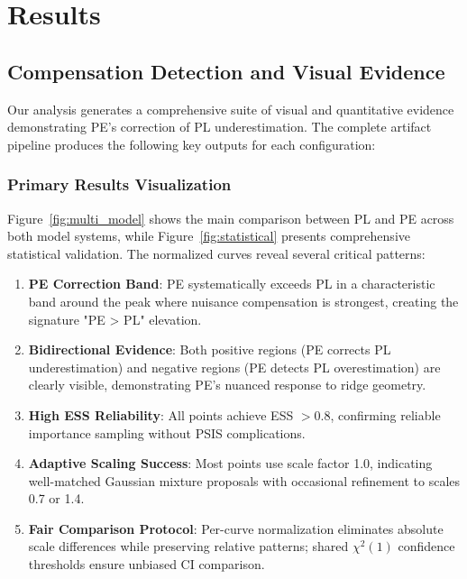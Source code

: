 \documentclass[conference]{IEEEtran}
\begin{document}
\section{Results}

\subsection{Compensation Detection and Visual Evidence}

Our analysis generates a comprehensive suite of visual and quantitative evidence demonstrating PE's correction of PL underestimation. The complete artifact pipeline produces the following key outputs for each configuration:

\subsubsection{Primary Results Visualization}
Figure~\ref{fig:multi_model} shows the main comparison between PL and PE across both model systems, while Figure~\ref{fig:statistical} presents comprehensive statistical validation. The normalized curves reveal several critical patterns:

\begin{enumerate}
\item \textbf{PE Correction Band}: PE systematically exceeds PL in a characteristic band around the peak where nuisance compensation is strongest, creating the signature "PE > PL" elevation.
\item \textbf{Bidirectional Evidence}: Both positive regions (PE corrects PL underestimation) and negative regions (PE detects PL overestimation) are clearly visible, demonstrating PE's nuanced response to ridge geometry.
\item \textbf{High ESS Reliability}: All points achieve ESS $> 0.8$, confirming reliable importance sampling without PSIS complications.
\item \textbf{Adaptive Scaling Success}: Most points use scale factor 1.0, indicating well-matched Gaussian mixture proposals with occasional refinement to scales 0.7 or 1.4.
\item \textbf{Fair Comparison Protocol}: Per-curve normalization eliminates absolute scale differences while preserving relative patterns; shared $\chi^2(1)$ confidence thresholds ensure unbiased CI comparison.
\end{enumerate}
\end{document}
